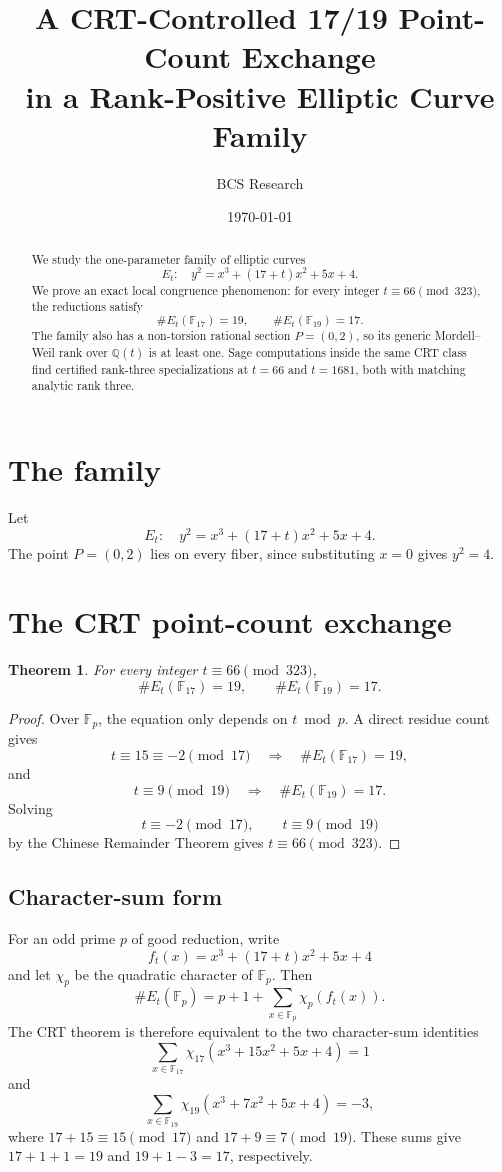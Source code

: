 \documentclass[11pt]{article}
\title{A CRT-Controlled 17/19 Point-Count Exchange\\
in a Rank-Positive Elliptic Curve Family}
\author{BCS Research}
\date{\today}
\newtheorem{theorem}{Theorem}
\newcommand{\Q}{\mathbb{Q}}
\newcommand{\F}{\mathbb{F}}
\begin{document}
\maketitle

\begin{abstract}
We study the one-parameter family of elliptic curves
\[
E_t:\quad y^2=x^3+(17+t)x^2+5x+4.
\]
We prove an exact local congruence phenomenon: for every integer
\(t\equiv 66 \pmod{323}\), the reductions satisfy
\[
\#E_t(\F_{17})=19,\qquad \#E_t(\F_{19})=17.
\]
The family also has a non-torsion rational section \(P=(0,2)\), so its
generic Mordell--Weil rank over \(\Q(t)\) is at least one. Sage computations
inside the same CRT class find certified rank-three specializations at
\(t=66\) and \(t=1681\), both with matching analytic rank three.
\end{abstract}

\section{The family}

Let
\[
E_t:\quad y^2=x^3+(17+t)x^2+5x+4.
\]
The point \(P=(0,2)\) lies on every fiber, since substituting \(x=0\)
gives \(y^2=4\).

\section{The CRT point-count exchange}

\begin{theorem}
For every integer \(t\equiv 66 \pmod{323}\),
\[
\#E_t(\F_{17})=19,\qquad \#E_t(\F_{19})=17.
\]
\end{theorem}

\begin{proof}
Over \(\F_p\), the equation only depends on \(t\bmod p\). A direct residue
count gives
\[
t\equiv 15\equiv -2 \pmod{17}\quad\Longrightarrow\quad
\#E_t(\F_{17})=19,
\]
and
\[
t\equiv 9 \pmod{19}\quad\Longrightarrow\quad
\#E_t(\F_{19})=17.
\]
Solving
\[
t\equiv -2 \pmod{17},\qquad t\equiv 9 \pmod{19}
\]
by the Chinese Remainder Theorem gives \(t\equiv 66\pmod{323}\).
\end{proof}

\subsection{Character-sum form}

For an odd prime \(p\) of good reduction, write
\[
f_t(x)=x^3+(17+t)x^2+5x+4
\]
and let \(\chi_p\) be the quadratic character of \(\F_p\). Then
\[
\#E_t(\F_p)=p+1+\sum_{x\in\F_p}\chi_p(f_t(x)).
\]
The CRT theorem is therefore equivalent to the two character-sum identities
\[
\sum_{x\in\F_{17}}\chi_{17}(x^3+15x^2+5x+4)=1
\]
and
\[
\sum_{x\in\F_{19}}\chi_{19}(x^3+7x^2+5x+4)=-3,
\]
where \(17+15\equiv 15\pmod{17}\) and \(17+9\equiv 7\pmod{19}\).
These sums give \(17+1+1=19\) and \(19+1-3=17\), respectively.
\end{document}
